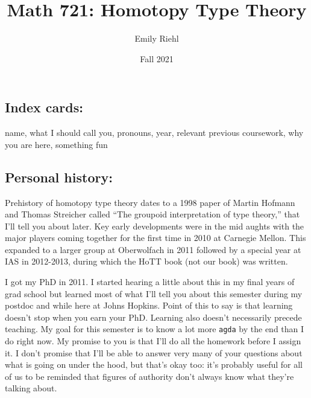 \documentclass{amsart}
\theoremstyle{theorem}
\theoremstyle{definition}
\theoremstyle{remark}
\newcommand{\0}{\mathbbe{0}}
\newcommand{\1}{\mathbbe{1}}
\newcommand{\2}{\mathbbe{2}}
\newcommand{\3}{\mathbbe{3}}
\newcommand{\4}{\mathbbe{4}}
\begin{document}
\title{Math 721: Homotopy Type Theory}
\author{Emily Riehl}
\date{Fall 2021}


\address{Dept.~of Mathematics\\Johns Hopkins University\\3400 N Charles St\\Baltimore, MD 21218}

\maketitle

\setcounter{tocdepth}{1}
\tableofcontents


\ifmine
\subsection*{Index cards:} name, what I should call you, pronouns, year, relevant previous coursework, why you are here, something fun


\subsection*{Personal history:}
Prehistory of homotopy type theory dates to a 1998 paper of Martin Hofmann and Thomas Streicher called ``The groupoid interpretation of type theory,'' that I'll tell you about later. Key early developments were in the mid aughts with the major players coming together for the first time in 2010 at Carnegie Mellon. This expanded to a larger group at Oberwolfach in 2011 followed by a special year at IAS in 2012-2013, during which the HoTT book (not our book) was written.

I got my PhD in 2011. I started hearing a little about this in my final years of grad school but learned most of what I'll tell you about this semester during my postdoc and while here at Johns Hopkins. Point of this to say is that learning doesn't stop when you earn your PhD. Learning also doesn't necessarily precede teaching. My goal for this semester is to know a lot more \texttt{agda} by the end than I do right now. My promise to you is that I'll do all the homework before I assign it. I don't promise that I'll be able to answer very many of your questions about what is going on under the hood, but that's okay too: it's probably useful for all of us to be reminded that figures of authority don't always know what they're talking about.
\end{document}
